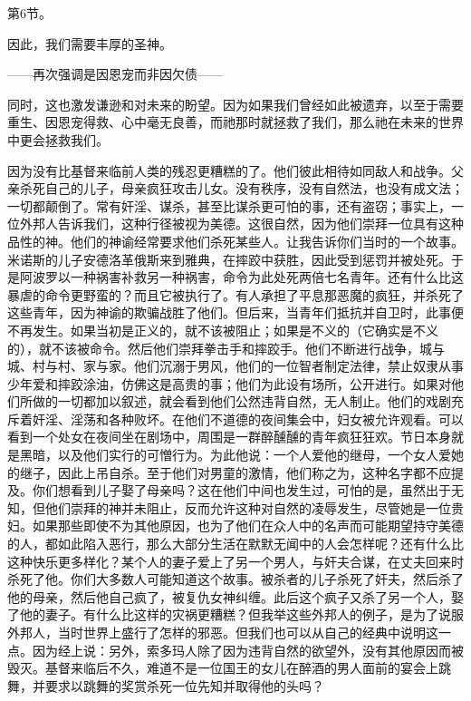 第6节。\par

因此，我们需要丰厚的圣神。\par

——再次强调是因恩宠而非因欠债——\par

同时，这也激发谦逊和对未来的盼望。因为如果我们曾经如此被遗弃，以至于需要重生、因恩宠得救、心中毫无良善，而祂那时就拯救了我们，那么祂在未来的世界中更会拯救我们。\par

因为没有比基督来临前人类的残忍更糟糕的了。他们彼此相待如同敌人和战争。父亲杀死自己的儿子，母亲疯狂攻击儿女。没有秩序，没有自然法，也没有成文法；一切都颠倒了。常有奸淫、谋杀，甚至比谋杀更可怕的事，还有盗窃；事实上，一位外邦人告诉我们，这种行径被视为美德。这很自然，因为他们崇拜一位具有这种品性的神。他们的神谕经常要求他们杀死某些人。让我告诉你们当时的一个故事。米诺斯的儿子安德洛革俄斯来到雅典，在摔跤中获胜，因此受到惩罚并被处死。于是阿波罗以一种祸害补救另一种祸害，命令为此处死两倍七名青年。还有什么比这暴虐的命令更野蛮的？而且它被执行了。有人承担了平息那恶魔的疯狂，并杀死了这些青年，因为神谕的欺骗战胜了他们。但后来，当青年们抵抗并自卫时，此事便不再发生。如果当初是正义的，就不该被阻止；如果是不义的（它确实是不义的），就不该被命令。然后他们崇拜拳击手和摔跤手。他们不断进行战争，城与城、村与村、家与家。他们沉溺于男风，他们的一位智者制定法律，禁止奴隶从事少年爱和摔跤涂油，仿佛这是高贵的事；他们为此设有场所，公开进行。如果对他们所做的一切都加以叙述，就会看到他们公然违背自然，无人制止。他们的戏剧充斥着奸淫、淫荡和各种败坏。在他们不道德的夜间集会中，妇女被允许观看。可以看到一个处女在夜间坐在剧场中，周围是一群醉醺醺的青年疯狂狂欢。节日本身就是黑暗，以及他们实行的可憎行为。为此他说：一个人爱他的继母，一个女人爱她的继子，因此上吊自杀。至于他们对男童的激情，他们称之为，这种名字都不应提及。你们想看到儿子娶了母亲吗？这在他们中间也发生过，可怕的是，虽然出于无知，但他们崇拜的神并未阻止，反而允许这种对自然的凌辱发生，尽管她是一位贵妇。如果那些即使不为其他原因，也为了他们在众人中的名声而可能期望持守美德的人，都如此陷入恶行，那么大部分生活在默默无闻中的人会怎样呢？还有什么比这种快乐更多样化？某个人的妻子爱上了另一个男人，与奸夫合谋，在丈夫回来时杀死了他。你们大多数人可能知道这个故事。被杀者的儿子杀死了奸夫，然后杀了他的母亲，然后他自己疯了，被复仇女神纠缠。此后这个疯子又杀了另一个人，娶了他的妻子。有什么比这样的灾祸更糟糕？但我举这些外邦人的例子，是为了说服外邦人，当时世界上盛行了怎样的邪恶。但我们也可以从自己的经典中说明这一点。因为经上说：另外，索多玛人除了因为违背自然的欲望外，没有其他原因而被毁灭。基督来临后不久，难道不是一位国王的女儿在醉酒的男人面前的宴会上跳舞，并要求以跳舞的奖赏杀死一位先知并取得他的头吗？\par

